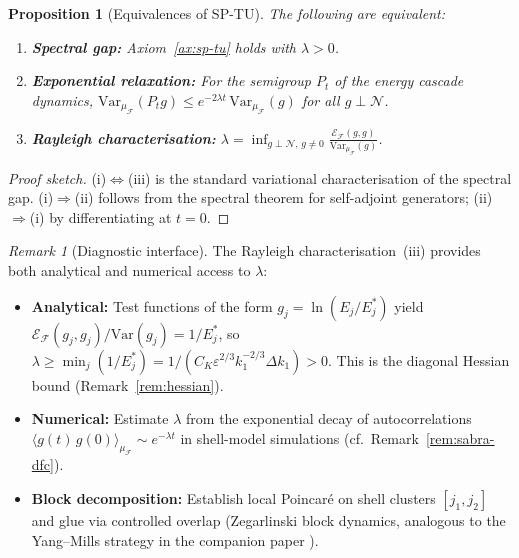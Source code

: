 \documentclass[12pt,a4paper]{article}
\theoremstyle{definition}
\theoremstyle{plain}
\newtheorem{proposition}[definition]{Proposition}
\theoremstyle{remark}
\newtheorem{remark}[definition]{Remark}
\begin{document}
\begin{proposition}[Equivalences of SP-TU]\label{prop:sp-equivalences}
The following are equivalent:
\begin{enumerate}
\item[(i)] \textbf{Spectral gap:} Axiom~\ref{ax:sp-tu} holds with $\lambda > 0$.
\item[(ii)] \textbf{Exponential relaxation:} For the semigroup $P_t$ of the energy cascade dynamics,
  $\mathrm{Var}_{\mu_{\mathcal{F}}}(P_t g) \leq e^{-2\lambda t}\, \mathrm{Var}_{\mu_{\mathcal{F}}}(g)$ for all $g \perp \mathcal{N}$.
\item[(iii)] \textbf{Rayleigh characterisation:}
  $\lambda = \inf_{g \perp \mathcal{N},\, g \neq 0} \frac{\mathcal{E}_{\mathcal{F}}(g,g)}{\mathrm{Var}_{\mu_{\mathcal{F}}}(g)}$.
\end{enumerate}
\end{proposition}

\begin{proof}[Proof sketch]
(i)$\Leftrightarrow$(iii) is the standard variational characterisation of the spectral gap. (i)$\Rightarrow$(ii) follows from the spectral theorem for self-adjoint generators; (ii)$\Rightarrow$(i) by differentiating at $t=0$.
\end{proof}

\begin{remark}[Diagnostic interface]\label{rem:sp-diagnostics}
The Rayleigh characterisation~(iii) provides both analytical and numerical access to $\lambda$:
\begin{itemize}
\item \textbf{Analytical:} Test functions of the form $g_j = \ln(E_j/E_j^*)$ yield $\mathcal{E}_{\mathcal{F}}(g_j, g_j) / \mathrm{Var}(g_j) = 1/E_j^*$, so $\lambda \geq \min_j (1/E_j^*) = 1/(C_K \varepsilon^{2/3} k_1^{-2/3} \Delta k_1) > 0$. This is the diagonal Hessian bound (Remark~\ref{rem:hessian}).
\item \textbf{Numerical:} Estimate $\lambda$ from the exponential decay of autocorrelations $\langle g(t)\, g(0) \rangle_{\mu_{\mathcal{F}}} \sim e^{-\lambda t}$ in shell-model simulations (cf.\ Remark~\ref{rem:sabra-dfc}).
\item \textbf{Block decomposition:} Establish local Poincar\'e on shell clusters $[j_1, j_2]$ and glue via controlled overlap (Zegarlinski block dynamics, analogous to the Yang--Mills strategy in the companion paper \cite{Geiger2026-YM}).
\end{itemize}
\end{remark}
\end{document}
